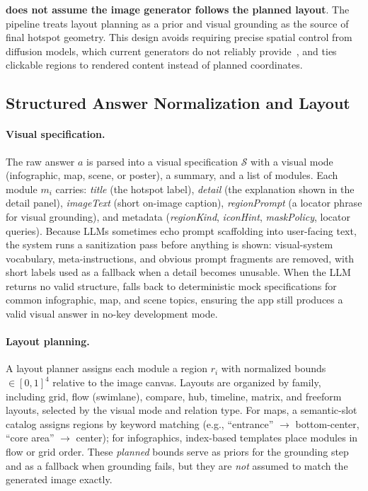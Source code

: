 \method{} \textbf{does not assume the image generator follows the planned
layout}. The pipeline treats layout planning as a prior and visual grounding as
the source of final hotspot geometry. This design avoids requiring precise
spatial control from diffusion models, which current generators do not reliably
provide~\citep{feng2023layoutgpt}, and ties clickable regions to rendered
content instead of planned coordinates.

\subsection{Structured Answer Normalization and Layout}
\label{sec:method_structure}

\paragraph{Visual specification.}
The raw answer $a$ is parsed into a visual specification $\mathcal{S}$ with a
visual mode (infographic, map, scene, or poster), a summary, and a list of
modules. Each module $m_i$ carries:
\textit{title} (the hotspot label), \textit{detail} (the explanation shown in
the detail panel), \textit{imageText} (short on-image caption),
\textit{regionPrompt} (a locator phrase for visual grounding), and metadata
(\textit{regionKind}, \textit{iconHint}, \textit{maskPolicy}, locator queries).
Because LLMs sometimes echo prompt scaffolding into user-facing text, the
system runs a sanitization pass before anything is shown: visual-system
vocabulary, meta-instructions, and obvious prompt fragments are removed, with
short labels used as a fallback when a detail becomes unusable. When the LLM
returns no valid structure, \method{} falls back to deterministic mock
specifications for common infographic, map, and scene topics, ensuring the app
still produces a valid visual answer in no-key development mode.

\paragraph{Layout planning.}
A layout planner assigns each module a region $r_i$ with normalized bounds
$\in [0,1]^4$ relative to the image canvas. Layouts are organized by
family, including grid, flow (swimlane), compare, hub, timeline, matrix, and
freeform layouts, selected by the visual mode and relation type. For maps, a
semantic-slot catalog assigns regions by keyword matching (e.g., ``entrance''
$\to$ bottom-center, ``core area'' $\to$ center); for infographics, index-based
templates place modules in flow or grid order. These \emph{planned} bounds
serve as priors for the grounding step and as a fallback when grounding fails,
but they are \emph{not} assumed to match the generated image exactly.

